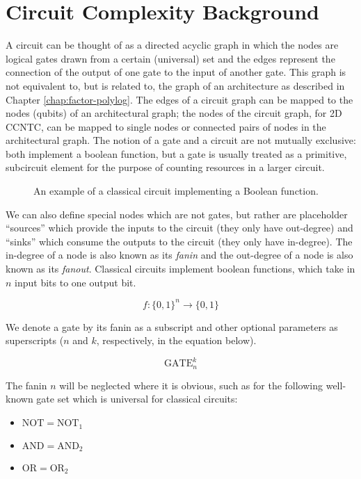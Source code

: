 \section{Circuit Complexity Background}
\label{sec:fsl-circuits}

A circuit can be thought of as a directed acyclic graph in which the nodes are
logical gates drawn from a certain (universal) set and the edges 
represent
the connection of the output of one gate to the input of another
gate. This graph is not equivalent to, but is related to, the graph of an architecture
as described in Chapter \ref{chap:factor-polylog}. The edges of a circuit graph can
be mapped to the nodes (qubits) of an architectural graph; the nodes of the
circuit graph, for 2D CCNTC, can be mapped to single nodes or connected pairs of nodes
in the architectural graph. The notion of a gate and a circuit are not mutually
exclusive: both implement a boolean function, but a gate is usually treated as
a primitive, subcircuit element for the purpose of counting resources in a larger circuit.

\begin{figure}
\caption{An example of a classical circuit implementing a Boolean function.}
\end{figure}

We can also define special nodes which are not gates, but rather
are placeholder ``sources'' which provide the inputs to the circuit (they only
have out-degree) and 
``sinks'' which consume the outputs to the circuit (they only have in-degree).
The in-degree of a 
node is also known as its \emph{fanin} and the out-degree of a node is
also known as its \emph{fanout}.
Classical circuits implement boolean functions, which take in $n$ input
bits to one output bit.

\begin{equation}
f:\{0,1\}^n \rightarrow \{0,1\}
\end{equation}

We denote a gate by its fanin as a subscript and other optional
parameters as superscripts ($n$ and $k$, respectively, in the equation below).

\begin{equation}
\text{GATE}_n^k
\end{equation}

The fanin $n$ will be neglected where it is obvious,
such as for the following well-known gate set which is universal
for classical circuits:

\begin{itemize}
\item $\text{NOT} = \text{NOT}_1$
\item $\text{AND} = \text{AND}_2$
\item $\text{OR} = \text{OR}_2$
\end{itemize}

